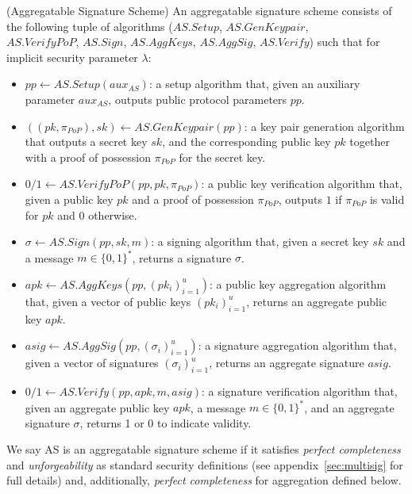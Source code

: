 \begin{definition}
\label{def:aggregate_signatures}
(Aggregatable Signature Scheme) An aggregatable signature scheme consists of
the following tuple of algorithms ($\mathit{AS.Setup}$, $\mathit{AS.GenKeypair}$, \\ $\mathit{AS.VerifyPoP}$, 
$\mathit{AS.Sign}$, $\mathit{AS.AggKeys}$, $\mathit{AS.AggSig}$, $\mathit{AS.Verify}$) 
such that for implicit security parameter $\lambda$:
\vspace{-0.05in}
\begin{itemize}

\item $\mathit{pp} \leftarrow  \mathit{AS.Setup}(\mathit{aux_{\mathit{AS}}})$: a setup algorithm that, given an 
auxiliary parameter $\mathit{aux_{\mathit{AS}}}$, outputs public protocol parameters $\mathit{pp}$. 

\item $((\mathit{pk},\mathit{\pi_{PoP}}),\mathit{sk}) \leftarrow \mathit{AS.GenKeypair}(\mathit{pp})$:
a key pair generation algorithm that
outputs 
a secret key $\mathit{sk}$,
and the corresponding public key $\mathit{pk}$
together with a proof of possession $\mathit{\pi_{PoP}}$ for the secret key.

\item $0/1 \leftarrow \mathit{AS.VerifyPoP}(\mathit{pp}, \mathit{pk},\mathit{\pi_{PoP}})$:
a public key verification algorithm that,
given a public key $\mathit{pk}$
and a proof of possession $\mathit{\pi_{PoP}}$,
outputs
$1$ if $\mathit{\pi_{PoP}}$ is valid for $\mathit{pk}$ and $0$ otherwise.

\item $\sigma \leftarrow \mathit{AS.Sign}(\mathit{pp}, \mathit{sk}, m)$:
a signing algorithm that,
given a secret key $\mathit{sk}$ and a message $m \in \{0, 1\}^*$, returns a signature $\sigma$.

\item $\mathit{apk} \leftarrow \mathit{AS.AggKeys}(\mathit{pp}, (\mathit{pk_i})_{i=1}^{u})$:
a public key aggregation algorithm that,
given a vector of public keys $(\mathit{pk_i})_{i=1}^u$,
returns
an aggregate public key $\mathit{apk}$.

\item $\mathit{asig} \leftarrow \mathit{AS.AggSig}(\mathit{pp}, (\sigma_i)_{i=1}^u)$:
a signature aggregation algorithm that,
given a vector of signatures $(\sigma_i)_{i=1}^u$,
returns
an aggregate signature $\mathit{asig}$.

\item $0/1 \leftarrow \mathit{AS.Verify}(\mathit{pp}, \mathit{apk}, m, \mathit{asig})$:
a signature verification algorithm that,
given an aggregate public key $\mathit{apk}$, a message $m \in \{0, 1\}^*$, and an aggregate signature $\sigma$,
returns
1 or 0 to indicate validity.
\end{itemize}
\vspace{-0.07in}
\noindent We say AS is an aggregatable signature scheme if it satisfies \emph{perfect completeness} and \emph{unforgeability} 
as standard security definitions (see appendix~\ref{sec:multisig} for full details) 
and, additionally, \emph{perfect completeness} for aggregation defined below.
\end{definition}

